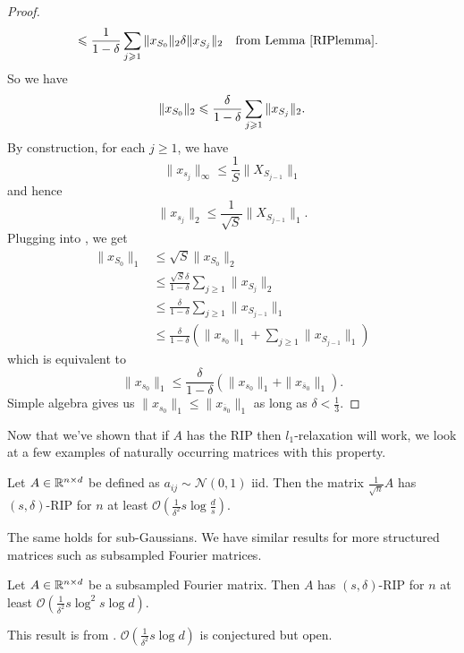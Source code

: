 \begin{proof}
\begin{align*}
                &\le \frac{1}{1 - \delta}\sum\limits_{j \ge 1}\|x_{S_0}\|_2 \delta \|x_{S_j}\|_2 && \text{from Lemma~\ref{RIPlemma}}.
\end{align*}
So we have
\begin{align}
\|x_{S_0}\|_2 \le \frac{\delta}{1 - \delta}\sum\limits_{j \ge 1}\|x_{S_j}\|_2.\equationlabel{l2norm}
\end{align}
By construction, for each $j \ge 1$, we have
\[
\|x_{s_j}\|_\infty \le \frac{1}{S}\|X_{S_{j-1}}\|_1
\]
and hence
\[
\|x_{s_j}\|_2 \le \frac{1}{\sqrt{S}}\|X_{S_{j-1}}\|_1.
\]
Plugging into , we get
\begin{align*}
\|x_{S_0}\|_1 &\le \sqrt{S}\|x_{S_0}\|_2\\
              &\le \frac{\sqrt{S}\delta}{1 - \delta}\sum\limits_{j \ge 1}\|x_{S_j}\|_2\\
              &\le \frac{\delta}{1 - \delta}\sum\limits_{j \ge 1}\|x_{S_{j-1}}\|_1\\
              &\le \frac{\delta}{1 - \delta}(\|x_{s_0}\|_1 + \sum\limits_{j \ge 1}\|x_{S_{j-1}}\|_1)
\end{align*}
which is equivalent to
\[
\|x_{s_0}\|_1 \le \frac{\delta}{1 - \delta}(\|x_{s_0}\|_1 + \|x_{\overline{s}_0}\|_1).
\]
Simple algebra gives us $\|x_{s_0}\|_1 \le \|x_{\overline{s}_0}\|_1$ as long as $\delta < \frac{1}{3}$.
\end{proof}
Now that we've shown that if $A$ has the RIP then $l_1$-relaxation will work, we look at a few examples of naturally occurring matrices with this property.
\begin{theorem}
Let $A \in \R^{n \times d}$ be defined as $a_{ij} \sim \mathcal{N}(0,1)$ iid. Then the matrix $\frac{1}{\sqrt{n}}A$ has $(s, \delta)$-RIP for $n$ at least $\mathcal{O}\left(\frac{1}{\delta^2}s \log{\frac{d}{s}}\right)$.
\end{theorem}
The same holds for sub-Gaussians. We have similar results for more structured matrices such as subsampled Fourier matrices.
\begin{theorem}
Let $A \in \R^{n \times d}$ be a subsampled Fourier matrix. Then $A$ has $(s, \delta)$-RIP for $n$ at least $\mathcal{O}\left(\frac{1}{\delta^2}s \log^2 s\log d\right)$.
\end{theorem}
This result is from \cite{DBLP:journals/corr/HavivR15a}. $\mathcal{O}\left(\frac{1}{\delta^2}s\log d\right)$ is conjectured but open.

